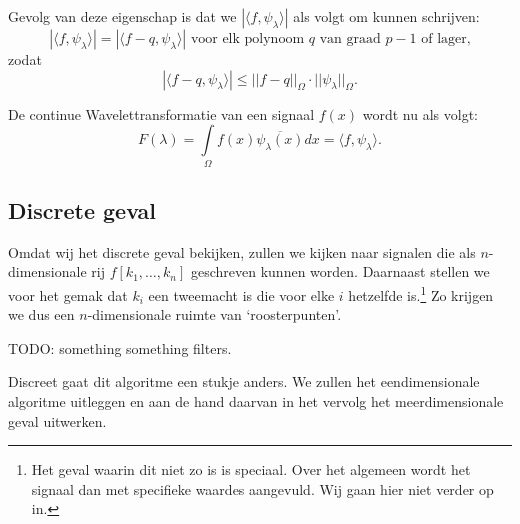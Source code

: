 \documentclass[11pt]{amsart}
\begin{document}
Gevolg van deze eigenschap is dat we $|\langle f, \psi_\lambda\rangle |$ als volgt om kunnen schrijven:
\[
	|\langle f, \psi_\lambda \rangle | = |\langle f-q, \psi_\lambda \rangle | \text{ voor elk polynoom $q$ van graad $p-1$ of lager,} 
\]
zodat
\[
	|\langle f-q, \psi_\lambda \rangle | \leq ||f-q||_\Omega \cdot ||\psi_\lambda||_\Omega.
\]


De continue Wavelettransformatie van een signaal $f(x)$ wordt nu als volgt:
\[
	F(\lambda) = \underset{\Omega}{\int} f(x) \overline{\psi_\lambda(x)} dx = \langle f, \psi_\lambda \rangle.
\]

\subsection{Discrete geval}
Omdat wij het discrete geval bekijken, zullen we kijken naar signalen die als $n$-dimensionale rij $f[k_1,\ldots,k_n]$ geschreven kunnen worden. Daarnaast stellen we voor het gemak dat $k_i$ een tweemacht is die voor elke $i$ hetzelfde is.\footnote{Het geval waarin dit niet zo is is speciaal. Over het algemeen wordt het signaal dan met specifieke waardes aangevuld. Wij gaan hier niet verder op in.} Zo krijgen we dus een $n$-dimensionale ruimte van `roosterpunten'.

TODO: something something filters.

Discreet gaat dit algoritme een stukje anders. We zullen het eendimensionale algoritme uitleggen en aan de hand daarvan in het vervolg het meerdimensionale geval uitwerken.
\end{document}

